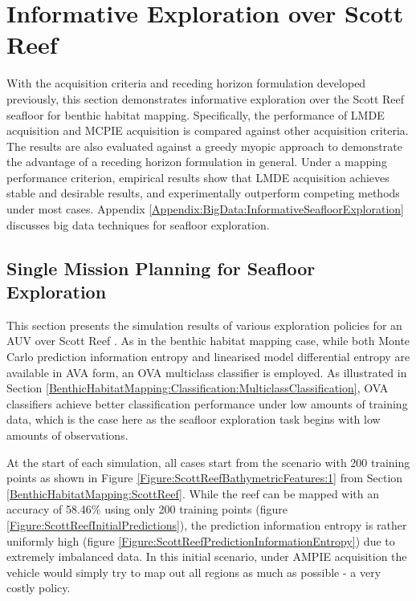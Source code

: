 			
	\section{Informative Exploration over Scott Reef}
	\label{InformativeSeafloorExploration:ScottReef}
	
		With the acquisition criteria and receding horizon formulation developed previously, this section demonstrates informative exploration over the Scott Reef seafloor for benthic habitat mapping. Specifically, the performance of LMDE acquisition and MCPIE acquisition is compared against other acquisition criteria. The results are also evaluated against a greedy myopic approach to demonstrate the advantage of a receding horizon formulation in general. Under a mapping performance criterion, empirical results show that LMDE acquisition achieves stable and desirable results, and experimentally outperform competing methods under most cases. Appendix \ref{Appendix:BigData:InformativeSeafloorExploration} discusses big data techniques for seafloor exploration.
						
		\subsection{Single Mission Planning for Seafloor Exploration}
		\label{InformativeSeafloorExploration:ScottReef:SingleMission}
					
			This section presents the simulation results of various exploration policies for an AUV over Scott Reef \citep{IMOS}. As in the benthic habitat mapping case, while both Monte Carlo prediction information entropy and linearised model differential entropy are available in AVA form, an OVA multiclass classifier is employed. As illustrated in Section \ref{BenthicHabitatMapping:Classification:MulticlassClassification}, OVA classifiers achieve better classification performance under low amounts of training data, which is the case here as the seafloor exploration task begins with low amounts of observations.
			
			At the start of each simulation, all cases start from the scenario with 200 training points as shown in Figure \ref{Figure:ScottReefBathymetricFeatures:1} from Section \ref{BenthicHabitatMapping:ScottReef}. While the reef can be mapped with an accuracy of 58.46\% using only 200 training points (figure \ref{Figure:ScottReefInitialPredictions}), the prediction information entropy is rather uniformly high (figure \ref{Figure:ScottReefPredictionInformationEntropy}) due to extremely imbalanced data. In this initial scenario, under AMPIE acquisition the vehicle would simply try to map out all regions as much as possible - a very costly policy. 

